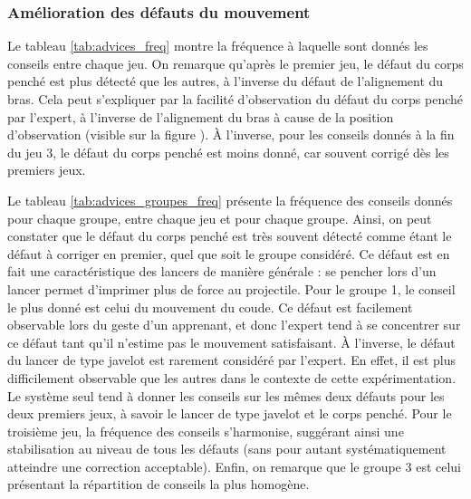 \subsubsection{Amélioration des défauts du mouvement}

Le tableau \ref{tab:advices_freq} montre la fréquence à laquelle sont donnés les conseils entre chaque jeu. On remarque qu'après le premier jeu, le défaut du corps penché est plus détecté que les autres, à l'inverse du défaut de l'alignement du bras. Cela peut s'expliquer par la facilité d'observation du défaut du corps penché par l'expert, à l'inverse de l'alignement du bras à cause de la position d'observation (visible sur la figure ). À l'inverse, pour les conseils donnés à la fin du jeu 3, le défaut du corps penché est moins donné, car souvent corrigé dès les premiers jeux.

Le tableau \ref{tab:advices_groupes_freq} présente la fréquence des conseils donnés pour chaque groupe, entre chaque jeu et pour chaque groupe. Ainsi, on peut constater que le défaut du corps penché est très souvent détecté comme étant le défaut à corriger en premier, quel que soit le groupe considéré. Ce défaut est en fait une caractéristique des lancers de manière générale : se pencher lors d'un lancer permet d'imprimer plus de force au projectile. Pour le groupe 1, le conseil le plus donné est celui du mouvement du coude. Ce défaut est facilement observable lors du geste d'un apprenant, et donc l'expert tend à se concentrer sur ce défaut tant qu'il n'estime pas le mouvement satisfaisant. À l'inverse, le défaut du lancer de type javelot est rarement considéré par l'expert. En effet, il est plus difficilement observable que les autres dans le contexte de cette expérimentation. Le système seul tend à donner les conseils sur les mêmes deux défauts pour les deux premiers jeux, à savoir le lancer de type javelot et le corps penché. Pour le troisième jeu, la fréquence des conseils s'harmonise, suggérant ainsi une stabilisation au niveau de tous les défauts (sans pour autant systématiquement atteindre une correction acceptable). Enfin, on remarque que le groupe 3 est celui présentant la répartition de conseils la plus homogène.

